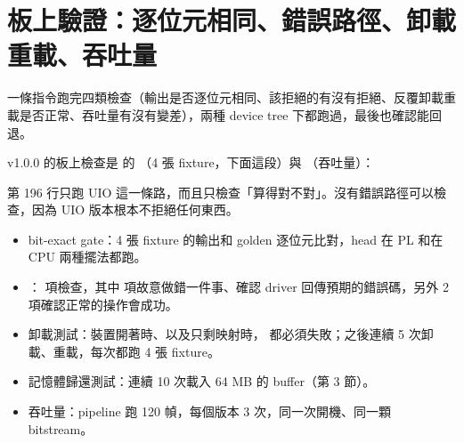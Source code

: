 \clearpage
\section{板上驗證：逐位元相同、錯誤路徑、卸載重載、吞吐量}
\label{sec:verify}

\begin{oneline}
 一條指令跑完四類檢查（輸出是否逐位元相同、該拒絕的有沒有拒絕、反覆卸載重載是否正常、吞吐量有沒有變差），兩種 device tree 下都跑過，最後也確認能回退。
\end{oneline}

\begin{before}
v1.0.0 的板上檢查是  的 （4 張 fixture，下面這段）與 （吞吐量）：


第 196 行只跑 UIO 這一條路，而且只檢查「算得對不對」。沒有錯誤路徑可以檢查，因為 UIO 版本根本不拒絕任何東西。
\end{before}

\begin{tech}
\begin{itemize}
\item bit-exact gate：4 張 fixture 的輸出和 golden 逐位元比對，head 在 PL 和在 CPU 兩種擺法都跑。
\item {}：\errChecks{} 項檢查，其中 \errRefusals{} 項故意做錯一件事、確認 driver 回傳預期的錯誤碼，另外 2 項確認正常的操作會成功。
\item 卸載測試：裝置開著時、以及只剩映射時， 都必須失敗；之後連續 5 次卸載、重載，每次都跑 4 張 fixture。
\item 記憶體歸還測試：連續 10 次載入 64 MB 的 buffer（第 3 節）。
\item 吞吐量：pipeline 跑 120 幀，每個版本 3 次，同一次開機、同一顆 bitstream。
\end{itemize}
\end{tech}

